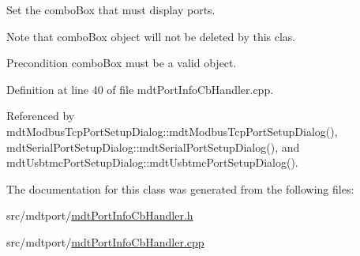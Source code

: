 Set the combo\-Box that must display ports. 

Note that combo\-Box object will not be deleted by this clas.

\begin{DoxyPrecond}{Precondition}
combo\-Box must be a valid object. 
\end{DoxyPrecond}


Definition at line 40 of file mdt\-Port\-Info\-Cb\-Handler.\-cpp.



Referenced by mdt\-Modbus\-Tcp\-Port\-Setup\-Dialog\-::mdt\-Modbus\-Tcp\-Port\-Setup\-Dialog(), mdt\-Serial\-Port\-Setup\-Dialog\-::mdt\-Serial\-Port\-Setup\-Dialog(), and mdt\-Usbtmc\-Port\-Setup\-Dialog\-::mdt\-Usbtmc\-Port\-Setup\-Dialog().



The documentation for this class was generated from the following files\-:\begin{DoxyCompactItemize}
\item 
src/mdtport/\hyperlink{mdt_port_info_cb_handler_8h}{mdt\-Port\-Info\-Cb\-Handler.\-h}\item 
src/mdtport/\hyperlink{mdt_port_info_cb_handler_8cpp}{mdt\-Port\-Info\-Cb\-Handler.\-cpp}\end{DoxyCompactItemize}
